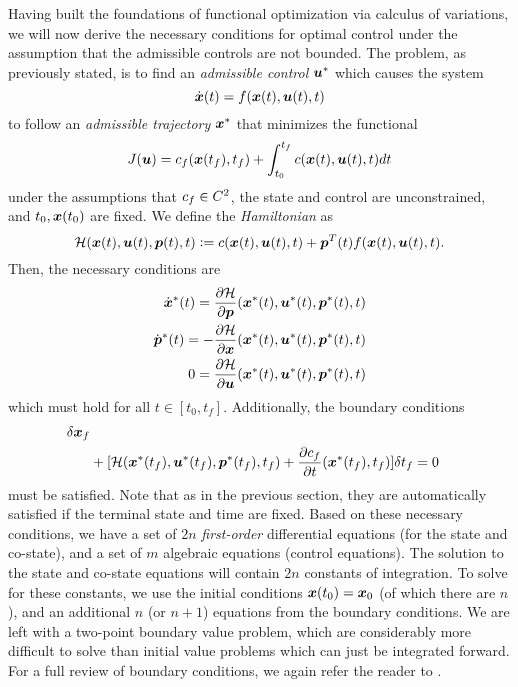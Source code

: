 Having built the foundations of functional optimization via calculus of variations, we will now derive the necessary conditions for optimal control under the assumption that the admissible controls are not bounded. The problem, as previously stated, is to find an \textit{admissible control} $\bm{u}^*$ which causes the system 
\begin{equation}
    \dot{\bm{x}}(t) = f(\bm{x}(t),\bm{u}(t),t)
\end{equation}
to follow an \textit{admissible trajectory} $\bm{x}^*$ that minimizes the functional
\begin{equation}
    J(\bm{u}) = c_f(\bm{x}(t_f),t_f) + \int_{t_0}^{t_f} c(\bm{x}(t),\bm{u}(t),t) dt
\end{equation}
under the assumptions that $c_f \in C^2$, the state and control are unconstrained, and $t_0, \bm{x}(t_0)$ are fixed. We define the \textit{Hamiltonian} as
\begin{equation}
    \mathcal{H}(\bm{x}(t),\bm{u}(t),\bm{p}(t),t) \vcentcolon= c(\bm{x}(t),\bm{u}(t),t) + \bm{p}^T(t) f(\bm{x}(t),\bm{u}(t),t).
\end{equation}
Then, the necessary conditions are 
\begin{align}
    \dot{\bm{x}}^*(t) = \frac{\partial \mathcal{H}}{\partial \bm{p}}(\bm{x}^*(t),\bm{u}^*(t),\bm{p}^*(t),t)\\
    \dot{\bm{p}}^*(t) = -\frac{\partial \mathcal{H}}{\partial \bm{x}}(\bm{x}^*(t),\bm{u}^*(t),\bm{p}^*(t),t)\\
    0 = \frac{\partial \mathcal{H}}{\partial \bm{u}}(\bm{x}^*(t),\bm{u}^*(t),\bm{p}^*(t),t)
\end{align}
which must hold for all $t \in [t_0,t_f]$. Additionally, the boundary conditions 
\begin{align}
    [\frac{\partial \cost_f}{\partial \st}(\st^*(t_f),t_f)& - \cst^*(t_f)] \delta \st_f\\
    & + [ \ham(\st^*(t_f),\ac^*(t_f), \cst^*(t_f), t_f) + \frac{\partial \cost_f}{\partial t}(\st^*(t_f),t_f)] \delta t_f = 0 \nonumber
\end{align}
must be satisfied. Note that as in the previous section, they are automatically satisfied if the terminal state and time are fixed. Based on these necessary conditions, we have a set of $2n$ \textit{first-order} differential equations (for the state and co-state), and a set of $m$ algebraic equations (control equations). The solution to the state and co-state equations will contain $2n$ constants of integration. To solve for these constants, we use the initial conditions $\bm{x}(t_0) = \bm{x}_0$ (of which there are $n$), and an additional $n$ (or $n+1$) equations from the boundary conditions. We are left with a two-point boundary value problem, which are considerably more difficult to solve than initial value problems which can just be integrated forward. For a full review of boundary conditions, we again refer the reader to \cite{kirk2012optimal}.

